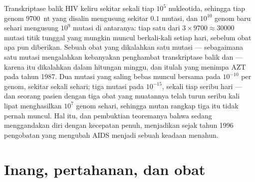 \begin{example}\label{ex:b3:virology:three-drugs}
Transkriptase balik HIV keliru sekitar sekali tiap $10^{5}$ nukleotida,
sehingga tiap genom \qty{9700}{nt} yang disalin mengusung sekitar $0.1$ mutasi,
dan $10^{10}$ genom baru sehari mengusung $10^{9}$ mutasi di antaranya: tiap
satu dari $3\times 9700 \approx \num{30000}$ mutasi titik tunggal yang mungkin
muncul berkali-kali setiap hari, sebelum obat apa pun diberikan. Sebuah obat
yang dikalahkan satu mutasi --- sebagaimana satu mutasi mengalahkan kebanyakan
penghambat transkriptase balik dan  --- karena itu
dikalahkan dalam hitungan minggu, dan itulah yang menimpa AZT pada tahun 1987.
Dua mutasi yang saling bebas muncul bersama pada $10^{-10}$ per genom, sekitar
sekali sehari; tiga mutasi pada $10^{-15}$, sekali tiap seribu hari --- dan
seorang pasien dengan tiga obat yang muatannya telah turun seribu kali lipat
menghasilkan $10^{7}$ genom sehari, sehingga mutan rangkap tiga itu tidak
pernah muncul. Hal itu, dan pembuktian teoremanya bahwa  sedang
menggandakan diri dengan kecepatan penuh, menjadikan  sejak
tahun 1996 pengobatan yang mengubah AIDS menjadi sebuah keadaan menahun.
\end{example}

\section{Inang, pertahanan, dan obat}


